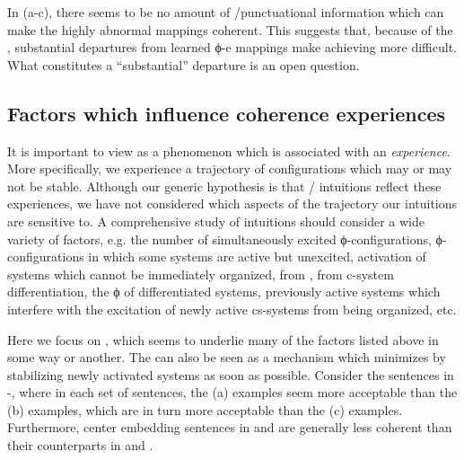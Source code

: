 \ea\label{ex:6:14}
\z
\z

In (a-c), there seems to be no amount of /punctuational information which can make the highly abnormal mappings coherent. This suggests that, because of the , substantial departures from learned ϕ-e mappings make achieving  more difficult. What constitutes a “substantial” departure is an open question.

\subsection{Factors which influence coherence experiences}

It is important to view  as a phenomenon which is associated with an \textit{experience}. More specifically, we experience a trajectory of  configurations which may or may not be stable. Although our generic hypothesis is that / intuitions reflect these experiences, we have not considered which aspects of the trajectory our intuitions are sensitive to. A comprehensive study of intuitions should consider a wide variety of factors, e.g. the number of simultaneously excited ϕ-configurations, ϕ-configurations in which some systems are active but unexcited, activation of systems which cannot be immediately organized,  from ,  from c-system differentiation, the ϕ of differentiated systems, previously active systems which interfere with the excitation of newly active cs-systems from being organized, etc. 

  Here we focus on , which seems to underlie many of the factors listed above in some way or another. The  can also be seen as a mechanism which minimizes  by stabilizing newly activated systems as soon as possible. Consider the sentences in -, where in each set of sentences, the (a) examples seem more acceptable than the (b) examples, which are in turn more acceptable than the (c) examples. Furthermore, center embedding sentences in  and  are generally less coherent than their  counterparts in  and .  


